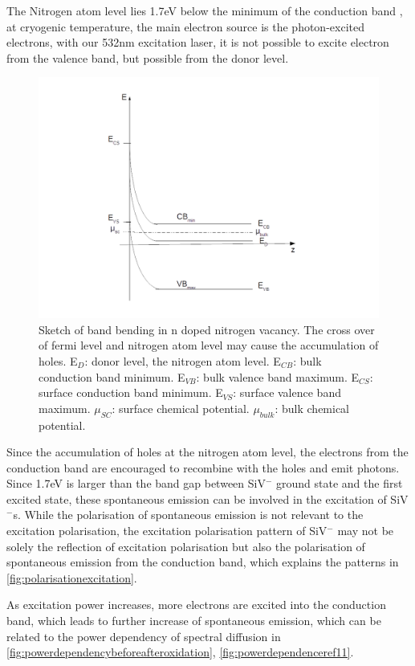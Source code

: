 The Nitrogen atom level lies 1.7eV below the minimum of the conduction band \citep{diederich_electron_1998}, at cryogenic temperature, the main electron source is the photon-excited electrons, with our 532nm excitation laser, it is not possible to excite electron from the valence band, but possible from the donor level.

\begin{figure}[h]
\centering
\includegraphics[width=1\linewidth]{Figures/pic/nbandbend}
\caption{Sketch of band bending in n doped nitrogen vacancy. The cross over of fermi level and nitrogen atom level may cause the accumulation of holes. E$_{D}$: donor level, the nitrogen atom level. E$_{CB}$: bulk conduction band minimum. E$_{VB}$: bulk valence band maximum. E$_{CS}$: surface conduction band minimum. E$_{VS}$: surface valence band maximum. $\mu_{SC}$: surface chemical potential. $\mu_{bulk}$: bulk chemical potential.} 
\label{fig:nbandbend}
\end{figure}
 

Since the accumulation of holes at the nitrogen atom level, the electrons from the conduction band are encouraged to recombine with the holes and emit photons. Since 1.7eV is larger than the band gap between SiV$^{-}$ ground state and the first excited state, these spontaneous emission can be involved in the excitation of SiV$^{-}$s. 
While the polarisation of spontaneous emission is not relevant to the excitation polarisation, the excitation polarisation pattern of SiV$^{-}$ may not be solely the reflection of excitation polarisation but also the polarisation of spontaneous emission from the conduction band, which explains the patterns in \ref{fig:polarisationexcitation}.

As excitation power increases, more electrons are excited into the conduction band, which leads to further increase of spontaneous emission, which can be related to the power dependency of spectral diffusion in \ref{fig:powerdependencybeforeafteroxidation}, \ref{fig:powerdependenceref11}.